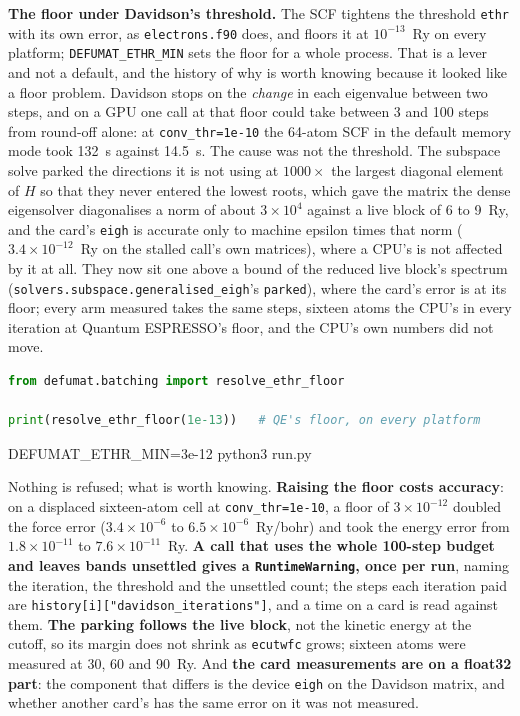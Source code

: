\documentclass[11pt,a4paper]{article}
\newcommand{\qe}{Quantum ESPRESSO}
\newcommand{\code}[1]{\texttt{\small #1}}
\begin{document}
\textbf{The floor under Davidson's threshold.} The SCF tightens the threshold
\code{ethr} with its own error, as \code{electrons.f90} does, and floors it at
$10^{-13}$~Ry on every platform; \code{DEFUMAT\_ETHR\_MIN} sets the floor for a
whole process. That is a lever and not a default, and the history of why is worth
knowing because it looked like a floor problem. Davidson stops on the \emph{change}
in each eigenvalue between two steps, and on a GPU one call at that floor could
take between 3 and 100 steps from round-off alone: at \code{conv\_thr=1e-10} the
64-atom SCF in the default memory mode took 132~s against 14.5~s. The cause was
not the threshold. The subspace solve parked the directions it is not using at
$1000\times$ the largest diagonal element of $H$ so that they never entered the
lowest roots, which gave the matrix the dense eigensolver diagonalises a norm of
about $3\times10^4$ against a live block of 6 to 9~Ry, and the card's \code{eigh}
is accurate only to machine epsilon times that norm ($3.4\times10^{-12}$~Ry on the
stalled call's own matrices), where a CPU's is not affected by it at all. They now
sit one above a bound of the reduced live block's spectrum
(\code{solvers.subspace.generalised\_eigh}'s \code{parked}), where the card's error
is at its floor; every arm measured takes the same steps, sixteen atoms the CPU's
in every iteration at \qe's floor, and the CPU's own numbers did not move.

\begin{lstlisting}[language=Python]
from defumat.batching import resolve_ethr_floor

print(resolve_ethr_floor(1e-13))   # QE's floor, on every platform
\end{lstlisting}

\begin{shcode}
DEFUMAT_ETHR_MIN=3e-12 python3 run.py
\end{shcode}

\begin{refuses}
Nothing is refused; what is worth knowing. \textbf{Raising the floor costs accuracy}:
on a displaced sixteen-atom cell at \code{conv\_thr=1e-10}, a floor of $3\times10^{-12}$
doubled the force error ($3.4\times10^{-6}$ to $6.5\times10^{-6}$~Ry/bohr) and took the
energy error from $1.8\times10^{-11}$ to $7.6\times10^{-11}$~Ry. \textbf{A call that
uses the whole 100-step budget and leaves bands unsettled gives a
\code{RuntimeWarning}, once per run}, naming the iteration, the threshold and the
unsettled count; the steps each iteration paid are
\code{history[i]["davidson\_iterations"]}, and a time on a card is read against them.
\textbf{The parking follows the live block}, not the kinetic energy at the
cutoff, so its margin does not shrink as \code{ecutwfc} grows; sixteen atoms were
measured at 30, 60 and 90~Ry. And \textbf{the
card measurements are on a float32 part}: the component that differs is the device
\code{eigh} on the Davidson matrix, and whether another card's has the same error
on it was not measured.
\end{refuses}
\end{document}
